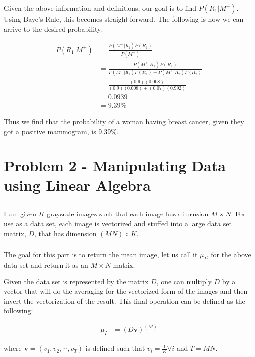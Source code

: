 \documentclass{article}[12pt]
\begin{document}
   Given the above information and definitions, our goal is to find $P(R_1 | M^{+})$. Using Baye's Rule, this becomes straight forward. The following is how we can arrive to the desired probability:
   
   \begin{align*}
   P(R_1 | M^{+}) &= \frac{P(M^{+} | R_1) P(R_1) }{P(M^{+})} \\
   &= \frac{P(M^{+} | R_1) P(R_1) }{P(M^{+} | R_1) P(R_1) + P(M^{+} | R_2) P(R_2)} \\
   &= \frac{(0.9) (0.008) }{(0.9) (0.008) + (0.07) (0.992)} \\
   &= 0.0939 \\
   &= 9.39\%
   \end{align*}
   
   Thus we find that the probability of a woman having breast cancer, given they got a positive mammogram, is 9.39\%.

	\newpage
	\section{Problem 2 - Manipulating Data using Linear Algebra}
	\subsection{}
	I am given $K$ grayscale images such that each image has dimension $M \times N$. For use as a data set, each image is vectorized and stuffed into a large data set matrix, $D$, that has dimension $(MN) \times K$.
	
	\subsubsection{}
	The goal for this part is to return the mean image, let us call it $\mu_I$, for the above data set and return it as an $M \times N$ matrix. 
	
	Given the data set is represented by the matrix $D$, one can multiply $D$ by a vector that will do the averaging for the vectorized form of the images and then invert the vectorization of the result. This final operation can be defined as the following:
	
	\begin{align*}
	\mu_I &= (D \boldsymbol{v} )^{(M)}
	\end{align*}
	
	where $\boldsymbol{v} = (v_1, v_2, \cdots, v_{T})$ is defined such that $v_i = \frac{1}{K} \forall i$ and $T = MN$.
	
\end{document}
